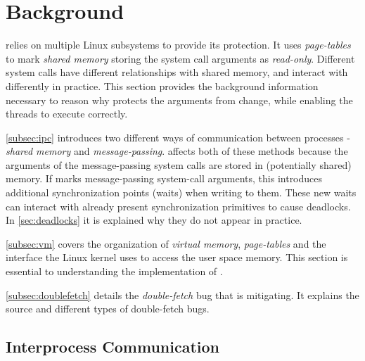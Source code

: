 \section{Background}
\label{sec:background}

\sysname relies on multiple Linux subsystems to provide its protection. It uses
\emph{page-tables} to mark \emph{shared memory} storing the system call
arguments as \emph{read-only}. Different system calls have different
relationships with shared memory, and interact with \sysname differently in
practice. This section provides the background information necessary to reason
why \sysname protects the arguments from change, while enabling the threads to
execute correctly.

\autoref{subsec:ipc} introduces two different ways of communication between
processes - \emph{shared memory} and \emph{message-passing}. \sysname affects both
of these methods because the arguments of the message-passing system calls are
stored in (potentially shared) memory. If \sysname marks message-passing
system-call arguments, this introduces additional synchronization points (waits)
when writing to them. These new waits can interact with already present
synchronization primitives to cause deadlocks. In \autoref{sec:deadlocks} it is
explained why they do not appear in practice.

\autoref{subsec:vm} covers the organization of \emph{virtual memory},
\emph{page-tables} and the interface the Linux kernel uses to access the user
space memory. This section is essential to understanding the implementation of
\sysname.

\autoref{subsec:doublefetch} details the \emph{double-fetch} bug that \sysname
is mitigating. It explains the source and different types of double-fetch bugs.


\subsection{Interprocess Communication}
\label{subsec:ipc}

